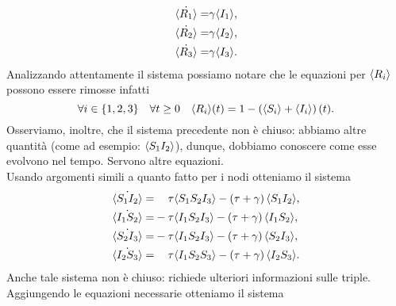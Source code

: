 \begin{equation*} 
\begin{aligned}
	\dot{\langle R_1 \rangle} = & \gamma \langle  I_1 \rangle,\\
	\dot{\langle R_2 \rangle} = & \gamma \langle  I_2 \rangle,\\
 	\dot{\langle R_3 \rangle} = & \gamma \langle  I_3 \rangle.
 	\end{aligned}
\end{equation*}
Analizzando attentamente il sistema possiamo notare che le equazioni per $\langle R_i \rangle$ possono essere rimosse infatti 
$$ \forall i\in\{1, 2, 3\} \quad \forall t\geq 0 \quad \langle R_i \rangle(t) = 1 - \left( \langle S_i \rangle +\langle I_i \rangle \right)(t).$$
Osserviamo, inoltre, che il sistema precedente non \`e chiuso: abbiamo altre quantit\`a  (come ad esempio: $\langle S_1I_2 \rangle$), dunque, dobbiamo conoscere come esse evolvono nel tempo. Servono altre equazioni.\\
Usando argomenti simili a quanto fatto per i nodi otteniamo  il sistema 
\begin{equation*}
\begin{aligned}
	\dot{\angol{S_1I_2}}=&\spa\tau\angol{S_1S_2I_3} - \tonde{ \tau + \gamma}\angol{S_1 I_2},
\\
	\dot{\angol{I_1S_2}}=&-\tau\angol{I_1S_2I_3} - \tonde{ \tau + \gamma}\angol{I_1 S_2},
\\
	\dot{\angol{S_2I_3}}=&-\tau\angol{I_1S_2I_3} - \tonde{ \tau + \gamma}\angol{S_2 I_3},
\\
	\dot{\angol{I_2S_3}}=&\spa\tau\angol{I_1S_2S_3} - \tonde{ \tau + \gamma}\angol{I_2 S_3}.
	\end{aligned}
\end{equation*}
Anche tale sistema non \`e chiuso: richiede  ulteriori informazioni sulle triple.\\
Aggiungendo le equazioni necessarie otteniamo il sistema 
